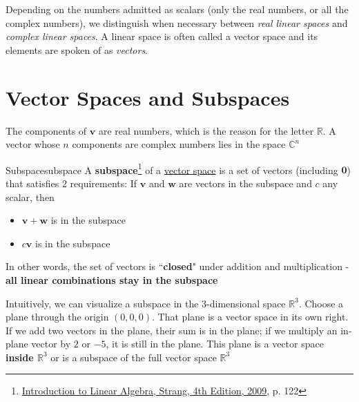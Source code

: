 Depending on the numbers admitted as scalars (only the real numbers, or all the complex numbers), we distinguish when
necessary between \textit{real linear spaces} and \textit{complex linear spaces}. A linear space is often called a
\hypertarget{vector-space}{vector space} and its elements are spoken of as \textit{vectors}.

\section{Vector Spaces and Subspaces}


The components of $\boldsymbol{v}$ are real numbers, which is the reason for the letter $\mathbb{R}$. A vector whose $n$
components are complex numbers lies in the space $\mathbb{C}^n$

\begin{Definition}{Subspace}{subspace}
    A \textbf{subspace}\footnote{\href{https://trello.com/c/qHJeDNkU}{Introduction to Linear Algebra, Strang, 4th Edition, 2009}, p. 122}
    of a \hyperlink{vector-space}{vector space} is a set of vectors (including $\boldsymbol{0}$) that satisfies 2
    requirements: If $\boldsymbol{v}$ and $\boldsymbol{w}$ are vectors in the subspace and $c$ any scalar, then

    \begin{itemize}
        \item $\boldsymbol{v} + \boldsymbol{w}$ is in the subspace
        \item $c\boldsymbol{v}$ is in the subspace
    \end{itemize}

    In other words, the set of vectors is ``\textbf{closed}" under addition and multiplication - \textbf{all linear combinations
    stay in the subspace}

\end{Definition}

Intuitively, we can visualize a subspace in the 3-dimensional space $\mathbb{R}^3$. Choose a plane through the
origin $(0, 0, 0)$. That plane is a vector space in its own right. If we add two vectors in the plane, their sum is in
the plane; if we multiply an in-plane vector by $2$ or $-5$, it is still in the plane. This plane is a vector space
\textbf{inside $\mathbb{R}^3$} or is a subspace of the full vector space $\mathbb{R}^3$

